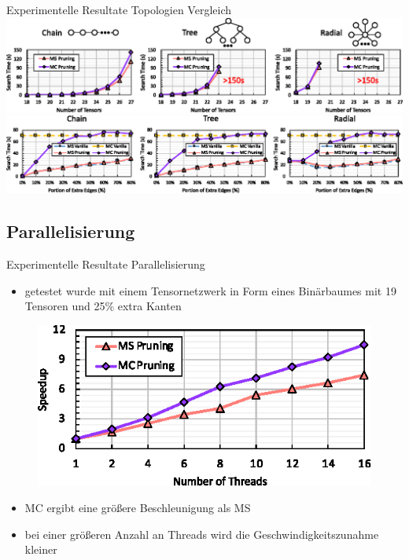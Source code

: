 \documentclass{beamer}
\begin{document}
\begin{frame}{Experimentelle Resultate Topologien Vergleich}
	\includegraphics[scale=.6]{figure_09}
	\includegraphics[scale=.6]{figure_10}
\end{frame}

\subsection{Parallelisierung}

\begin{frame}{Experimentelle Resultate Parallelisierung}
	\begin{itemize}
		\item getestet wurde mit einem Tensornetzwerk in Form eines Binärbaumes mit 19 Tensoren und 25\% extra Kanten
	\end{itemize}
	\begin{figure}
		\includegraphics{figure_13}
	\end{figure} \pause
	\begin{itemize}
		\item MC ergibt eine größere Beschleunigung als MS
		\item bei einer größeren Anzahl an Threads wird die Geschwindigkeitszunahme kleiner
	\end{itemize}
\end{frame}
\end{document}
